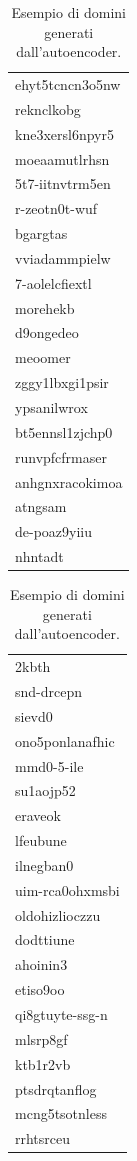\begin{table}[!bp]
\centering
	\begin{tabular}{l}
	\toprule
	ehyt5tcncn3o5nw \\
	reknclkobg \\
	kne3xersl6npyr5 \\
	moeaamutlrhsn \\
	5t7-iitnvtrm5en \\
	r-zeotn0t-wuf \\
	bgargtas \\
	vviadammpielw \\
	7-aolelcfiextl \\
	morehekb \\
	d9ongedeo  \\
	meoomer \\
	zggy1lbxgi1psir \\
	ypsanilwrox \\
	bt5ennsl1zjchp0 \\
	runvpfcfrmaser \\
	anhgnxracokimoa \\
	atngsam \\
	de-poaz9yiiu \\
	nhntadt \\
	\bottomrule
	\end{tabular}
	\begin{tabular}{l}
	\toprule
	2kbth \\
	snd-drcepn \\
	sievd0 \\
	ono5ponlanafhic \\
	mmd0-5-ile \\
	su1aojp52 \\
	eraveok \\
	lfeubune \\
	ilnegban0 \\
	uim-rca0ohxmsbi \\
	oldohizlioczzu \\
	dodttiune \\
	ahoinin3 \\
	etiso9oo \\
	qi8gtuyte-ssg-n \\
	mlsrp8gf \\
	ktb1r2vb \\
	ptsdrqtanflog \\
	mcng5tsotnless \\
	rrhtsrceu \\
	\bottomrule
	\end{tabular}
\caption{Esempio di domini generati dall'autoencoder. \label{tab:autoenc}}
\end{table}

